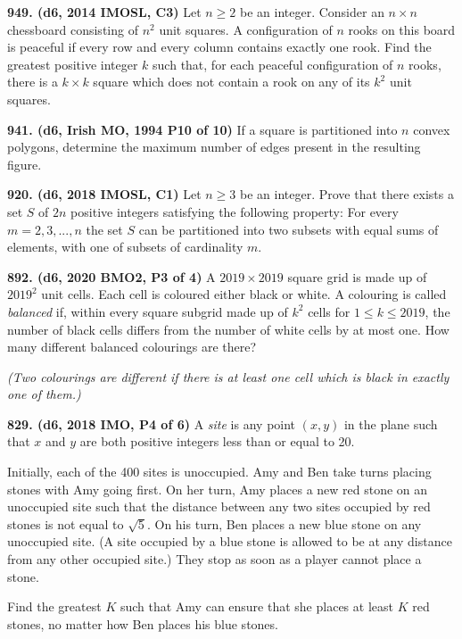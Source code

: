 \documentclass{article}
\begin{document}
        \textbf{949. (\color{red}d6\color{black}, 2014 IMOSL, C3)} Let $n \geq 2$ be an integer. Consider an  $n \times n$ chessboard consisting of $n^2$ unit squares. A configuration of $n$ rooks on this board is peaceful if every row and every column contains exactly one rook. Find the greatest positive integer $k$ such that, for each peaceful configuration of $n$ rooks, there is a $k \times k$ square which does not contain a rook on any of its $k^2$ unit squares.

        \textbf{941. (\color{red}d6\color{black}, Irish MO, 1994 P10 of 10)} If a square is partitioned into $n$ convex polygons, determine the maximum number of edges present in the resulting figure.

        \textbf{920. (\color{red}d6\color{black}, 2018 IMOSL, C1)} Let $n\geq 3$ be an integer. Prove that there exists a set $S$ of $2n$ positive integers satisfying the following property: For every $m=2,3,...,n$ the set $S$ can be partitioned into two subsets with equal sums of elements, with one of subsets of cardinality $m$.

        \textbf{892. (\color{red}d6\color{black}, 2020 BMO2, P3 of 4)} A $2019\times 2019$ square grid is made up of $2019^2$ unit cells. Each cell is coloured either black or white. A colouring is called \textit{balanced} if, within every square subgrid made up of $k^2$ cells for $1\le k\le 2019$, the number of black cells differs from the number of white cells by at most one. How many different balanced colourings are there?

        \textit{(Two colourings are different if there is at least one cell which is black in exactly one of them.)}

        \textbf{829. (\color{red}d6\color{black}, 2018 IMO, P4 of 6)} A \textit{site} is any point $(x, y)$ in the plane such that $x$ and $y$ are both positive integers less than or equal to 20.

        Initially, each of the 400 sites is unoccupied. Amy and Ben take turns placing stones with Amy going first. On her turn, Amy places a new red stone on an unoccupied site such that the distance between any two sites occupied by red stones is not equal to $\sqrt{5}$. On his turn, Ben places a new blue stone on any unoccupied site. (A site occupied by a blue stone is allowed to be at any distance from any other occupied site.) They stop as soon as a player cannot place a stone.

        Find the greatest $K$ such that Amy can ensure that she places at least $K$ red stones, no matter how Ben places his blue stones.
\end{document}
